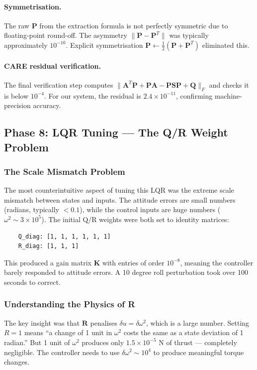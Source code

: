 \documentclass[12pt, a4paper]{article}
\newcommand{\bK}{\bm{K}}
\newcommand{\bA}{\bm{A}}
\newcommand{\bP}{\bm{P}}
\newcommand{\bQ}{\bm{Q}}
\newcommand{\bR}{\bm{R}}
\begin{document}
\paragraph{Symmetrisation.}  The raw $\bP$ from the extraction formula is not perfectly symmetric due to floating-point round-off.  The asymmetry $\|\bP - \bP^T\|$ was typically approximately $10^{-10}$.  Explicit symmetrisation $\bP \leftarrow \frac{1}{2}(\bP + \bP^T)$ eliminated this.

\paragraph{CARE residual verification.}  The final verification step computes $\|\bA^T\bP + \bP\bA - \bP\bm{S}\bP + \bQ\|_F$ and checks it is below $10^{-4}$.  For our system, the residual is $2.4 \times 10^{-11}$, confirming machine-precision accuracy.

\subsection{Phase 8: LQR Tuning --- The Q/R Weight Problem}

\subsubsection{The Scale Mismatch Problem}

The most counterintuitive aspect of tuning this LQR was the extreme scale mismatch between states and inputs.  The attitude errors are small numbers (radians, typically $< 0.1$), while the control inputs are huge numbers ($\omega^2 \sim 3 \times 10^5$).  The initial Q/R weights were both set to identity matrices:
\begin{verbatim}
    Q_diag: [1, 1, 1, 1, 1, 1]
    R_diag: [1, 1, 1]
\end{verbatim}
This produced a gain matrix $\bK$ with entries of order $10^{-8}$, meaning the controller barely responded to attitude errors.  A 10 degree roll perturbation took over 100 seconds to correct.

\subsubsection{Understanding the Physics of R}

The key insight was that $\bR$ penalises $\delta u = \delta\omega^2$, which is a large number.  Setting $R = 1$ means ``a change of 1 unit in $\omega^2$ costs the same as a state deviation of 1 radian.''  But 1 unit of $\omega^2$ produces only $1.5 \times 10^{-5}$ N of thrust --- completely negligible.  The controller needs to use $\delta\omega^2 \sim 10^4$ to produce meaningful torque changes.
\end{document}
